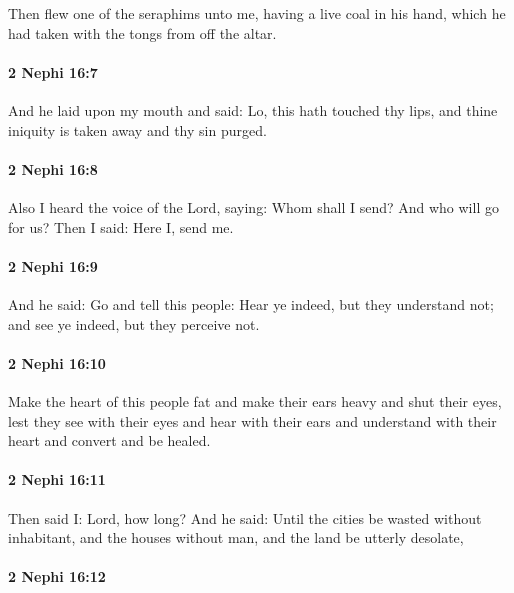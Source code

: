 			Then flew one of the seraphims unto me,
			having a live coal in his hand,
			which he had taken with the tongs from off the altar.

		\paragraph{2 Nephi 16:7} %
			\label{2NEPHI-16-7}

			And he laid upon my mouth and said:
			Lo, this hath touched thy lips,
			and thine iniquity is taken away and thy sin purged.

		\paragraph{2 Nephi 16:8} %
			\label{2NEPHI-16-8}

			Also I heard the voice of the Lord, saying:
			Whom shall I send?
			And who will go for us?
			Then I said:
			Here I, send me.

		\paragraph{2 Nephi 16:9} %
			\label{2NEPHI-16-9}

			And he said:
			Go and tell this people:
			Hear ye indeed, but they understand not;
			and see ye indeed, but they perceive not.

		\paragraph{2 Nephi 16:10} %
			\label{2NEPHI-16-10}

			Make the heart of this people fat and make their ears heavy and shut their eyes,
			lest they see with their eyes and hear with their ears
			and understand with their heart and convert and be healed.

		\paragraph{2 Nephi 16:11} %
			\label{2NEPHI-16-11}

			Then said I:
			Lord, how long?
			And he said:
			Until the cities be wasted without inhabitant,
			and the houses without man,
			and the land be utterly desolate,

		\paragraph{2 Nephi 16:12} %
			\label{2NEPHI-16-12}

